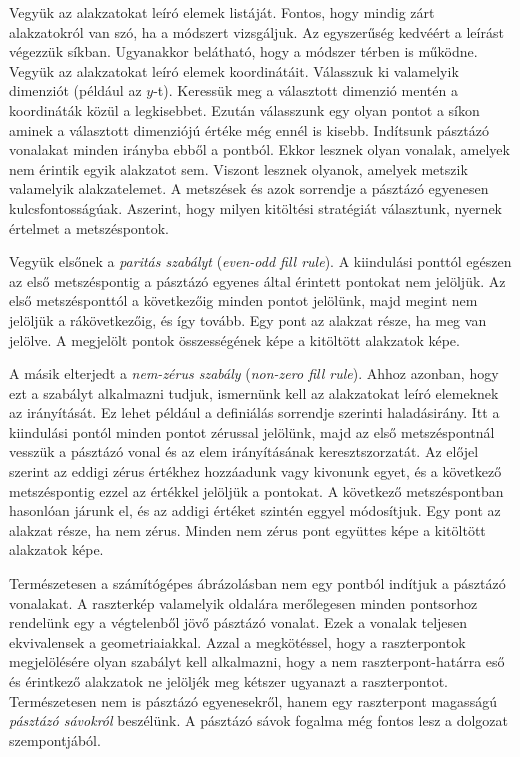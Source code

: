 \documentclass[12pt]{report}
\theoremstyle{definition}
\newcommand{\inenglish}[1]{\textsl{#1}}
\begin{document}
Vegyük az alakzatokat leíró elemek listáját. Fontos, hogy mindig zárt
alakzatokról van szó, ha a módszert vizsgáljuk. Az egyszerűség kedvéért a
leírást végezzük síkban. Ugyanakkor belátható, hogy a módszer térben is működne.
Vegyük az alakzatokat leíró elemek koordinátáit. Válasszuk ki valamelyik
dimenziót (például az $y$-t). Keressük meg a választott dimenzió mentén a
koordináták közül a legkisebbet. Ezután válasszunk egy olyan pontot a síkon
aminek a választott dimenziójú értéke még ennél is kisebb. Indítsunk pásztázó
vonalakat minden irányba ebből a pontból. Ekkor lesznek olyan vonalak, amelyek
nem érintik egyik alakzatot sem. Viszont lesznek olyanok, amelyek metszik
valamelyik alakzatelemet. A metszések és azok sorrendje a pásztázó egyenesen
kulcsfontosságúak. Aszerint, hogy milyen kitöltési stratégiát választunk,
nyernek értelmet a metszéspontok.

Vegyük elsőnek a \emph{paritás szabályt} (\inenglish{even-odd fill rule}). A
kiindulási ponttól egészen az első metszéspontig a pásztázó egyenes által
érintett pontokat nem jelöljük. Az első metszésponttól a következőig minden
pontot jelölünk, majd megint nem jelöljük a rákövetkezőig, és így tovább. Egy
pont az alakzat része, ha meg van jelölve. A megjelölt pontok összességének képe
a kitöltött alakzatok képe.

A másik elterjedt a \emph{nem-zérus szabály} (\inenglish{non-zero fill rule}).
Ahhoz azonban, hogy ezt a szabályt alkalmazni tudjuk, ismernünk kell az
alakzatokat leíró elemeknek az irányítását. Ez lehet például a definiálás
sorrendje szerinti haladásirány. Itt a kiindulási pontól minden pontot zérussal
jelölünk, majd az első metszéspontnál vesszük a pásztázó vonal és az elem
irányításának keresztszorzatát. Az előjel szerint az eddigi zérus értékhez
hozzáadunk vagy kivonunk egyet, és a következő metszéspontig ezzel az értékkel
jelöljük a pontokat. A következő metszéspontban hasonlóan járunk el, és az
addigi értéket szintén eggyel módosítjuk. Egy pont az alakzat része, ha nem
zérus. Minden nem zérus pont együttes képe a kitöltött alakzatok képe.

Természetesen a számítógépes ábrázolásban nem egy pontból indítjuk a pásztázó
vonalakat. A raszterkép valamelyik oldalára merőlegesen minden pontsorhoz
rendelünk egy a végtelenből jövő pásztázó vonalat. Ezek a vonalak teljesen
ekvivalensek a geometriaiakkal. Azzal a megkötéssel, hogy a raszterpontok
megjelölésére olyan szabályt kell alkalmazni, hogy a nem raszterpont-határra
eső és érintkező alakzatok ne jelöljék meg kétszer ugyanazt a raszterpontot.
Természetesen nem is pásztázó egyenesekről, hanem egy raszterpont magasságú
\emph{pásztázó sávokról} beszélünk. A pásztázó sávok fogalma még fontos lesz a
dolgozat szempontjából.
\end{document}

